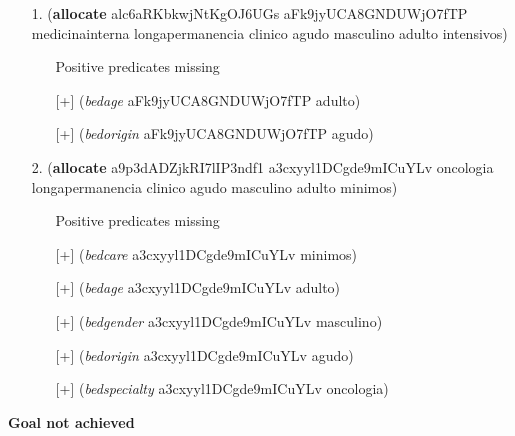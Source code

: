 \documentclass{article}
\begin{document}
\begin{itemize}
\item[1.] (\textbf{allocate} alc6aRKbkwjNtKgOJ6UGs aFk9jyUCA8GNDUWjO7fTP medicinainterna longapermanencia clinico agudo masculino adulto intensivos)
\begin{itemize}
	\item[\textbullet] Positive predicates missing
	\item[\textbullet] [+] (\textit{bedage} aFk9jyUCA8GNDUWjO7fTP adulto)
	\item[\textbullet] [+] (\textit{bedorigin} aFk9jyUCA8GNDUWjO7fTP agudo)
\end{itemize}
\item[2.] (\textbf{allocate} a9p3dADZjkRI7lIP3ndf1 a3cxyyl1DCgde9mICuYLv oncologia longapermanencia clinico agudo masculino adulto minimos)
\begin{itemize}
	\item[\textbullet] Positive predicates missing
	\item[\textbullet] [+] (\textit{bedcare} a3cxyyl1DCgde9mICuYLv minimos)
	\item[\textbullet] [+] (\textit{bedage} a3cxyyl1DCgde9mICuYLv adulto)
	\item[\textbullet] [+] (\textit{bedgender} a3cxyyl1DCgde9mICuYLv masculino)
	\item[\textbullet] [+] (\textit{bedorigin} a3cxyyl1DCgde9mICuYLv agudo)
	\item[\textbullet] [+] (\textit{bedspecialty} a3cxyyl1DCgde9mICuYLv oncologia)
\end{itemize}
\end{itemize}

\hline
\vspace{10pt}
\large \textbf{Goal not achieved}
\end{document}
